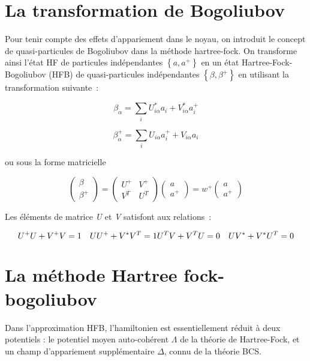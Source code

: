 \section{La transformation de Bogoliubov}

Pour tenir compte des effets d’appariement dans le noyau, on introduit le concept de quasi-particules de  Bogoliubov dans la méthode hartree-fock. On transforme ainsi l’état HF de particules indépendantes  $\left\{a,a^{+}\right\}$  en un état Hartree-Fock-Bogoliubov (HFB) de quasi-particules indépendantes $\left\{\beta,\beta^{+}\right\}$  en utilisant la transformation suivante :

\begin{equation}\beta _{\alpha }=\sum_{i} U_{\mathit{i\alpha }}^{\ast }a_i+V_{\mathit{i\alpha }}^{\ast
}a_i^{+}\end{equation}


\begin{equation}\beta _{\alpha }^{+} =\sum
_iU_{\mathit{i\alpha }}a_i^{+} + V_{\mathit{i\alpha
}}a_i\end{equation}



ou sous la forme matricielle 

\begin{equation}\left(\begin{matrix}\beta
\\\beta
^{+}\end{matrix}\right)=\left(\begin{matrix}U^{+}&V^{+}\\V^T&U^T\end{matrix}\right)\left(\begin{matrix}a\\a^{+}\end{matrix}\right)=w^{+}\left(\begin{matrix}a\\a^{+}\end{matrix}\right)\end{equation}


Les éléments de matrice \textit{U} et \textit{V}  satisfont aux relations : 

\begin{equation}U^{+} U+V^{+} V=1 \quad UU^{+}+V^{\ast }V^T=1\\ U^TV+V^TU=0 \quad UV^{\ast }+V^{\ast }U^T=0\end{equation}
    
  

\section{ La méthode Hartree fock-bogoliubov}
Dans l’approximation HFB, l’hamiltonien est essentiellement réduit à deux potentiels : le potentiel moyen auto-cohérent $\Lambda $  de la théorie de Hartree-Fock, et un champ d’appariement supplémentaire $\Delta $, connu de la théorie BCS.


